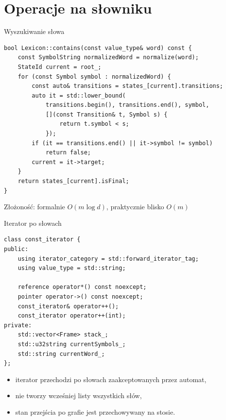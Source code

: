 \documentclass{beamer}
\begin{document}
\section{Operacje na słowniku}


\begin{frame}[fragile]{Wyszukiwanie słowa}
    \begin{verbatim}
bool Lexicon::contains(const value_type& word) const {
    const SymbolString normalizedWord = normalize(word);
    StateId current = root_;
    for (const Symbol symbol : normalizedWord) {
        const auto& transitions = states_[current].transitions;
        auto it = std::lower_bound(
            transitions.begin(), transitions.end(), symbol,
            [](const Transition& t, Symbol s) {
                return t.symbol < s;
            });
        if (it == transitions.end() || it->symbol != symbol)
            return false;
        current = it->target;
    }
    return states_[current].isFinal;
}
\end{verbatim}
    Złożoność: formalnie \(O(m \log d)\), praktycznie blisko \(O(m)\)
\end{frame}

\begin{frame}[fragile]{Iterator po słowach}
    \begin{verbatim}
class const_iterator {
public:
    using iterator_category = std::forward_iterator_tag;
    using value_type = std::string;

    reference operator*() const noexcept;
    pointer operator->() const noexcept;
    const_iterator& operator++();
    const_iterator operator++(int);
private:
    std::vector<Frame> stack_;
    std::u32string currentSymbols_;
    std::string currentWord_;
};
\end{verbatim}

    \begin{itemize}
        \item iterator przechodzi po słowach zaakceptowanych przez automat,
        \item nie tworzy wcześniej listy wszystkich słów,
        \item stan przejścia po grafie jest przechowywany na stosie.
    \end{itemize}
\end{frame}
\end{document}
